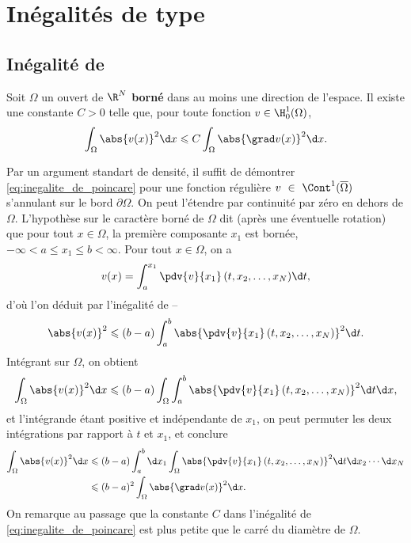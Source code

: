 \chapter{Inégalités de type }

\section{Inégalité de }

\begin{lemme}
Soit $\Omega$ un ouvert de $\R^N$ \textbf{borné} dans au moins une direction de l'espace. Il existe une constante $C > 0$ telle que, pour toute fonction $v \in \H^1_0(\Omega)$,
\begin{equation}\label{eq:inegalite_de_poincare}
\int_\Omega \abs{v(x)}^2 \d x \leqslant C \int_\Omega \abs{\grad v(x)}^2 \d x.
\end{equation}
\end{lemme}

\begin{demo}
Par un argument standart de densité, il suffit de démontrer \ref{eq:inegalite_de_poincare} pour une fonction régulière $v~\in~\Cont^1(\overline{\Omega})$ s'annulant sur le bord $\partial \Omega$. On peut l'étendre par continuité par zéro en dehors de $\Omega$. L'hypothèse sur le caractère borné de $\Omega$ dit (après une éventuelle rotation) que pour tout $x \in \Omega$, la première composante $x_1$ est bornée, $-\infty < a \leqslant x_1 \leqslant b < \infty$. Pour tout $x \in \Omega$, on a
\[
v(x) = \int_a^{x_1} \pdv{v}{x_1}\,(t, x_2, \dots, x_N) \d t,
\]
d'où l'on déduit par l'inégalité de --
\[
\abs{v(x)}^2 \leqslant (b - a) \int_a^b \abs{\pdv{v}{x_1}\,(t, x_2, \dots, x_N)}^2 \d t.
\]
Intégrant sur $\Omega$, on obtient
\[
\int_\Omega \abs{v(x)}^2 \d x \leqslant (b - a) \int_\Omega \int_a^b \abs{\pdv{v}{x_1}\,(t, x_2, \dots, x_N)}^2 \d t \d x,
\]
et l'intégrande étant positive et indépendante de $x_1$, on peut permuter les deux intégrations par rapport à $t$ et $x_1$, et conclure
\begin{align*}
\int_\Omega \abs{v(x)}^2 \d x &\leqslant (b - a) \int_a^b \d x_1 \int_\Omega \abs{\pdv{v}{x_1}\,(t, x_2, \dots, x_N)}^2 \d t \d x_2 \cdots \d x_N \\
&\leqslant (b - a)^2 \int_\Omega \abs{\grad v(x)}^2 \d x.
\end{align*}
On remarque au passage que la constante $C$ dans l'inégalité de  \ref{eq:inegalite_de_poincare} est plus petite que le carré du diamètre de $\Omega$.
\end{demo}

